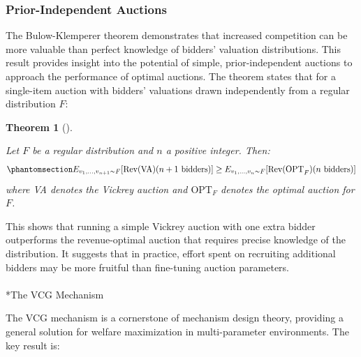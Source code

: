 \documentclass[
  letterpaper,
  numbers=noenddot,
  DIV=11]{scrreprt}
\makeatletter
\let\oldparagraph\paragraph
\renewcommand{\paragraph}{
    \@ifstar
      \xxxParagraphStar
      \xxxParagraphNoStar
  }
\newcommand{\xxxParagraphStar}[1]{\oldparagraph*{#1}\mbox{}}
\newcommand{\xxxParagraphNoStar}[1]{\oldparagraph{#1}\mbox{}}
\theoremstyle{plain}
\newtheorem{theorem}{Theorem}[chapter]
\theoremstyle{definition}
\theoremstyle{plain}
\theoremstyle{remark}
\makeatother
\begin{document}
\subsubsection*{Prior-Independent
Auctions}\label{prior-independent-auctions}

The Bulow-Klemperer theorem demonstrates that increased competition can
be more valuable than perfect knowledge of bidders' valuation
distributions. This result provides insight into the potential of
simple, prior-independent auctions to approach the performance of
optimal auctions. The theorem states that for a single-item auction with
bidders' valuations drawn independently from a regular distribution
\(F\):

\begin{tcolorbox}[colframe=.grey, title=\faPenSquare \enspace Theorem]

\begin{theorem}[]\protect\hypertarget{thm-bulow-klemperer}{}\label{thm-bulow-klemperer}

Let \(F\) be a regular distribution and \(n\) a positive integer. Then:
\begin{equation}\phantomsection\label{eq-eq3.64}{E_{v_1,\ldots,v_{n+1} \sim F}[\text{Rev(VA)}(n+1 \text{ bidders})] \geq E_{v_1,\ldots,v_n \sim F}[\text{Rev(OPT}_F)(n \text{ bidders})]}\end{equation}
where VA denotes the Vickrey auction and \(\text{OPT}_F\) denotes the
optimal auction for \(F\).

\end{theorem}

\end{tcolorbox}

This shows that running a simple Vickrey auction with one extra bidder
outperforms the revenue-optimal auction that requires precise knowledge
of the distribution. It suggests that in practice, effort spent on
recruiting additional bidders may be more fruitful than fine-tuning
auction parameters.

\paragraph*{The VCG Mechanism}\label{the-vcg-mechanism}

The VCG mechanism is a cornerstone of mechanism design theory, providing
a general solution for welfare maximization in multi-parameter
environments. The key result is:
\end{document}
